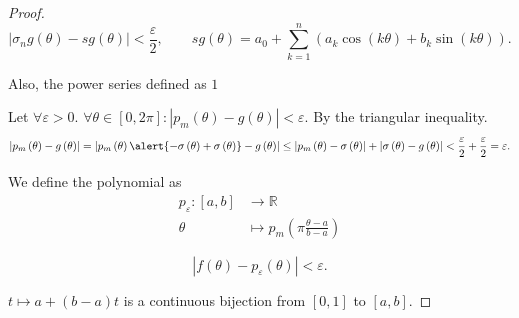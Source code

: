 \begin{frame}[allowframebreaks]
\begin{proof}
		\begin{equation*}
			\left|
			\sigma_{n}g\left(\theta\right)-
			sg\left(\theta\right)
			\right|<
			\frac{\varepsilon}{2},\qquad
			sg\left(\theta\right)=
			a_{0}+
			\sum\limits_{k=1}^{n}
			\left(
			a_{k}\cos\left(k\theta\right)+
			b_{k}\sin\left(k\theta\right)
			\right).
		\end{equation*}

		Also, the power series defined as
		\begin{math}
			1
		\end{math}

		\framebreak

		Let $\forall\varepsilon>0$.
		\begin{math}
			\forall\theta\in\left[0,2\pi\right]:
			\left|p_{m}\left(\theta\right)-g\left(\theta\right)\right|
			<\varepsilon
		\end{math}.
		By the triangular inequality.
		\begin{equation*}
			\left|
			p_{m}\left(\theta\right)-
			g\left(\theta\right)
			\right|=
			\left|
			p_{m}\left(\theta\right)
			\alert{
				-\sigma\left(\theta\right)+
				\sigma\left(\theta\right)
			}
			-g\left(\theta\right)
			\right|
			\leq
			\left|
			p_{m}\left(\theta\right)-\sigma\left(\theta\right)
			\right|+
			\left|
			\sigma\left(\theta\right)-g\left(\theta\right)
			\right|
			<\frac{\varepsilon}{2}+
			\frac{\varepsilon}{2}=
			\varepsilon.
		\end{equation*}

		We define the polynomial as
		\begin{align*}
			p_{\varepsilon}\colon\left[a,b\right] & \to\mathds{R} \\
			\theta                                & \mapsto
			p_{m}\left(\pi\frac{\theta-a}{b-a}\right)
		\end{align*}

		\begin{equation*}
			\left|
			f\left(\theta\right)-
			p_{\varepsilon}\left(\theta\right)
			\right|<
			\varepsilon.
		\end{equation*}

		\begin{math}
			t\mapsto a+\left(b-a\right)t
		\end{math}
		is a continuous bijection from $\left[0,1\right]$
		to $\left[a,b\right]$.
	\end{proof}
\end{frame}